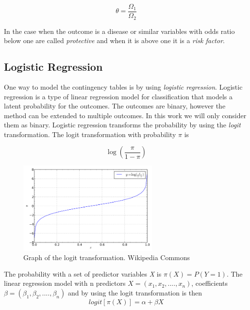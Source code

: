 \documentclass[10pt,a4paper]{report}
\begin{document}
\begin{equation}\label{eq:odds_ratio}
\theta=\frac{\Omega_1}{\Omega_2}
\end{equation}

In the case when the outcome is a disease or similar variables with odds ratio below one are called \emph{protective} and when it is above one it is a \emph{risk factor}\cite{recoding_2011}.

\subsection{Logistic Regression}
One way to model the contingency tables is by using \emph{logistic regression}. Logistic regression is a type of linear regression model for classification that models a latent probability for the outcomes. The outcomes are binary, however the method can be extended to multiple outcomes. In this work we will only consider them as binary. Logistic regression transforms the probability by using the \emph{logit} transformation. The logit transformation with probability $\pi$ is \cite{agresti_categorical}

\begin{equation}\label{eq:logit}
\log(\frac{\pi}{1-\pi})
\end{equation}

\begin{figure}[h]
    \centering
    \includegraphics[width=7cm]{logit.png}
    \caption{Graph of the logit transformation. Wikipedia Commons}
    \label{fig:logit}
\end{figure}

The probability with a set of predictor variables \emph{X} is $\pi(X)=P(Y=1)$. The linear regression model with n predictors $X=(x_1,x_2,....,x_n)$, coefficients $\beta=(\beta_1, \beta_2,....,\beta_n)$ and by using the logit transformation is then\cite{agresti_categorical}
\begin{equation}\label{eq:logit_lr}
logit[\pi(X)]=\alpha+\beta X
\end{equation}
\end{document}
